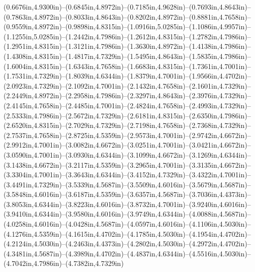 (0.6676in,4.9300in)--(0.6845in,4.8972in)--(0.7185in,4.9628in)--(0.7693in,4.8643in)--(0.7863in,4.8972in)--(0.8033in,4.8643in)--(0.8202in,4.8972in)--(0.8881in,4.7658in)--(0.9559in,4.8972in)--(0.9898in,4.8315in)--(1.0916in,5.0285in)--(1.1086in,4.9957in)--(1.1255in,5.0285in)--(1.2442in,4.7986in)--(1.2612in,4.8315in)--(1.2782in,4.7986in)--(1.2951in,4.8315in)--(1.3121in,4.7986in)--(1.3630in,4.8972in)--(1.4138in,4.7986in)--(1.4308in,4.8315in)--(1.4817in,4.7329in)--(1.5495in,4.8643in)--(1.5835in,4.7986in)--(1.6004in,4.8315in)--(1.6343in,4.7658in)--(1.6683in,4.8315in)--(1.7361in,4.7001in)--(1.7531in,4.7329in)--(1.8039in,4.6344in)--(1.8379in,4.7001in)--(1.9566in,4.4702in)--(2.0923in,4.7329in)--(2.1092in,4.7001in)--(2.1432in,4.7658in)--(2.1601in,4.7329in)--(2.2449in,4.8972in)--(2.2958in,4.7986in)--(2.3297in,4.8643in)--(2.3976in,4.7329in)--(2.4145in,4.7658in)--(2.4485in,4.7001in)--(2.4824in,4.7658in)--(2.4993in,4.7329in)--(2.5333in,4.7986in)--(2.5672in,4.7329in)--(2.6181in,4.8315in)--(2.6350in,4.7986in)--(2.6520in,4.8315in)--(2.7029in,4.7329in)--(2.7198in,4.7658in)--(2.7368in,4.7329in)--(2.7537in,4.7658in)--(2.8725in,4.5359in)--(2.9573in,4.7001in)--(2.9742in,4.6672in)--(2.9912in,4.7001in)--(3.0082in,4.6672in)--(3.0251in,4.7001in)--(3.0421in,4.6672in)--(3.0590in,4.7001in)--(3.0930in,4.6344in)--(3.1099in,4.6672in)--(3.1269in,4.6344in)--(3.1438in,4.6672in)--(3.2117in,4.5359in)--(3.2965in,4.7001in)--(3.3135in,4.6672in)--(3.3304in,4.7001in)--(3.3643in,4.6344in)--(3.4152in,4.7329in)--(3.4322in,4.7001in)--(3.4491in,4.7329in)--(3.5339in,4.5687in)--(3.5509in,4.6016in)--(3.5679in,4.5687in)--(3.5848in,4.6016in)--(3.6187in,4.5359in)--(3.6357in,4.5687in)--(3.7036in,4.4373in)--(3.8053in,4.6344in)--(3.8223in,4.6016in)--(3.8732in,4.7001in)--(3.9240in,4.6016in)--(3.9410in,4.6344in)--(3.9580in,4.6016in)--(3.9749in,4.6344in)--(4.0088in,4.5687in)--(4.0258in,4.6016in)--(4.0428in,4.5687in)--(4.0597in,4.6016in)--(4.1106in,4.5030in)--(4.1276in,4.5359in)--(4.1615in,4.4702in)--(4.1785in,4.5030in)--(4.1954in,4.4702in)--(4.2124in,4.5030in)--(4.2463in,4.4373in)--(4.2802in,4.5030in)--(4.2972in,4.4702in)--(4.3481in,4.5687in)--(4.3989in,4.4702in)--(4.4837in,4.6344in)--(4.5516in,4.5030in)--(4.7042in,4.7986in)--(4.7382in,4.7329in)
